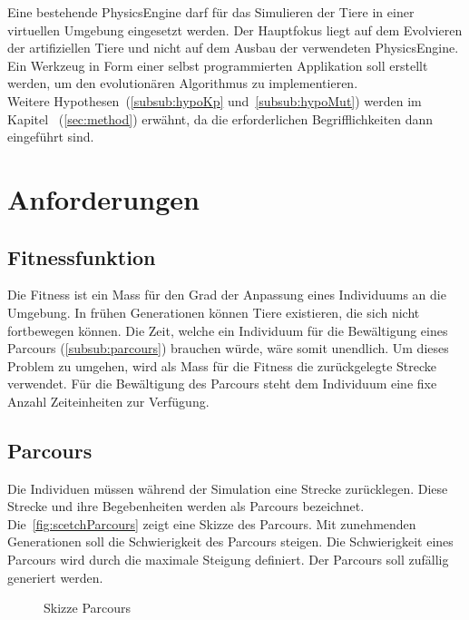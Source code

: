     Eine bestehende \gls{PhysicsEngine} darf für das Simulieren der Tiere in einer virtuellen Umgebung eingesetzt werden.
    Der Hauptfokus liegt auf dem Evolvieren der artifiziellen Tiere und
    nicht auf dem Ausbau der verwendeten \gls{PhysicsEngine}.
    Ein Werkzeug in Form einer selbst programmierten Applikation soll erstellt werden,
    um den evolutionären Algorithmus zu implementieren.
    \\
    Weitere Hypothesen~(\vref{subsub:hypoKp} und~\vref{subsub:hypoMut})
    werden im Kapitel ~(\vref{sec:method}) erwähnt,
    da die erforderlichen Begrifflichkeiten dann eingeführt sind.

  \section{Anforderungen}

    \subsection{Fitnessfunktion}

      Die Fitness ist ein Mass für den Grad der Anpassung eines Individuums an die Umgebung.
      In frühen Generationen können Tiere existieren, die sich nicht fortbewegen können.
      Die Zeit, welche ein Individuum für die Bewältigung eines Parcours (\vref{subsub:parcours}) brauchen würde,
      wäre somit unendlich.
      Um dieses Problem zu umgehen, wird als Mass für die Fitness die zurückgelegte Strecke verwendet.
      Für die Bewältigung des Parcours steht dem Individuum eine fixe Anzahl Zeiteinheiten zur Verfügung.

    \subsection{Parcours\label{subsub:parcours}}

      Die Individuen müssen während der Simulation eine Strecke zurücklegen.
      Diese Strecke und ihre Begebenheiten werden als Parcours bezeichnet.
      Die~\vref{fig:scetchParcours} zeigt eine Skizze des Parcours.
      Mit zunehmenden Generationen soll die Schwierigkeit des Parcours steigen.
      Die Schwierigkeit eines Parcours wird durch die maximale Steigung definiert.
      Der Parcours soll zufällig generiert werden.

      \begin{figure}[H]
        
        \caption{Skizze Parcours\label{fig:scetchParcours}}
      \end{figure}

